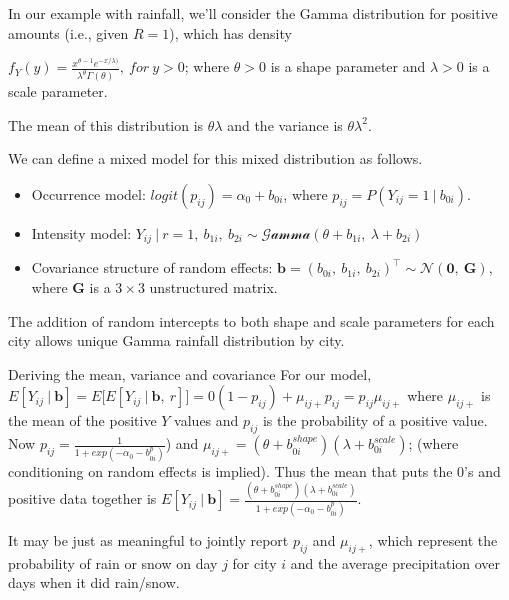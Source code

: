 \documentclass[
  9pt,
  ignorenonframetext,
]{beamer}
\begin{document}
\begin{frame}{}
\protect\hypertarget{section-2}{}
In our example with rainfall, we'll consider the Gamma distribution for
positive amounts (i.e., given \(R=1\)), which has density

\(f_Y (y)= \frac {x^{\theta -1} e^{-x/ \lambda)}} {\lambda^\theta \Gamma (\theta )},\ for\ y>0\);
where \(\theta >0\) is a shape parameter and \(\lambda>0\) is a scale
parameter.

The mean of this distribution is \(\theta \lambda\) and the variance is
\(\theta \lambda^2\).
\end{frame}

\begin{frame}{}
\protect\hypertarget{section-3}{}
We can define a mixed model for this mixed distribution as follows.

\begin{itemize}
\item
  Occurrence model: \(logit(p_{ij})=\alpha_0+b_{0i}\), where
  \(p_{ij}=P(Y_{ij}=1\ |\ b_{0i})\).
\item
  Intensity model:
  \(Y_{ij} \ |\ r=1,\ b_{1i},\ b_{2i} \sim \mathcal {Gamma} (\theta +b_{1i},\ \lambda+b_{2i} )\)
\item
  Covariance structure of random effects:
  \(\pmb b=(b_{0i},\ b_{1i},\ b_{2i} )^{\top} \sim \mathcal N(\pmb 0,\ \pmb G)\),
  where \(\pmb G\) is a \(3 \times 3\) unstructured matrix.
\end{itemize}

The addition of random intercepts to both shape and scale parameters for
each city allows unique Gamma rainfall distribution by city.
\end{frame}

\begin{frame}{Deriving the mean, variance and covariance}
\protect\hypertarget{deriving-the-mean-variance-and-covariance}{}
For our model,
\(E[Y_{ij} \ |\ \pmb b]=E\big[E[Y_{ij} \ |\ \pmb b,\ r]\big] = 0(1-p_{ij})+ \mu_{ij+} p_{ij}=p_{ij} \mu_{ij+}\)
where \(\mu_{ij+}\) is the mean of the positive \(Y\) values and
\(p_{ij}\) is the probability of a positive value. Now
\(p_{ij}=\frac 1 {1+exp (-\alpha _0-b_{0i}^p)}\)) and
\(\mu_{ij+}=(\theta +b_{0i}^{shape})(\lambda+b_{0i}^{scale})\); (where
conditioning on random effects is implied). Thus the mean that puts the
0's and positive data together is
\(E[Y_{ij} \ |\ \pmb b]= \frac {(\theta +b_{0i}^{shape})(\lambda+b_{0i}^{scale})} {1+exp (-\alpha _0-b_{0i}^p)}\).

It may be just as meaningful to jointly report \(p_{ij}\) and
\(\mu _{ij+}\), which represent the probability of rain or snow on day
\(j\) for city \(i\) and the average precipitation over days when it did
rain/snow.
\end{frame}
\end{document}
